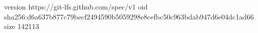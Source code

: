 version https://git-lfs.github.com/spec/v1
oid sha256:d6a637b877c79becf2494590b5059298e8cefbc50c963bdab947d6e04dc1ad66
size 142113
